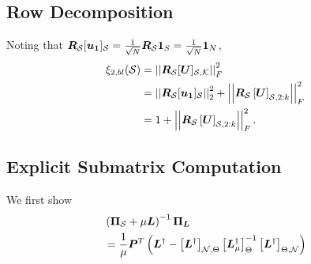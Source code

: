 \subsection{Row Decomposition}
Noting that $\matr{R}_{\set{S}}\vectsub[S]{{u}_{1}} = \frac{1}{\sqrt{N}}\matr{R}_\set{S}\vect{1}_{S} = \frac{1}{\sqrt{N}}\vect{1}_{N}$,
\begin{align}
    \xi_{2,bl}(\set{S}) &= \sqfrob{\matr{R}_{\set{S}}\matrsubU{S}} \\
    &= \sqnormvec{\matr{R}_{\set{S}}\vectsub[S]{u_{1}}} + \sqfrob{\matr{R}_{\set{S}}\msubgen[\set{S},2:k]{\matr{U}}} \\
    &= 1 + \sqfrob{\matr{R}_{\set{S}}\msubgen[\set{S},2:k]{\matr{U}}}.
\end{align}

\subsection{Explicit Submatrix Computation}
We first show
\begin{align}
    &\left(\proj{S} + \mu\matr{L}\right)^{-1}\projgen{\matr{L}} \\
    &= \frac{1}{\mu}\matr{P}^{T}\left( \matr{L}^{\dagger} - \msubgen[\set{N},\Theta]{\matr{L}^{\dagger}} \msubgen[\Theta]{ \matr{L}^{\dagger}_{\mu}}^{-1}\msubgen[\Theta,\set{N}]{\matr{L}^{\dagger}}\right)
\end{align}
